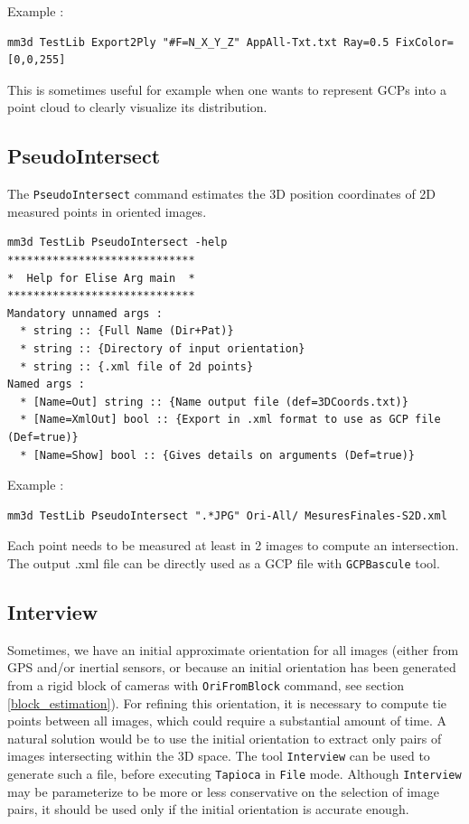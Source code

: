 Example :
\begin{verbatim}
mm3d TestLib Export2Ply "#F=N_X_Y_Z" AppAll-Txt.txt Ray=0.5 FixColor=[0,0,255]
\end{verbatim}

This is sometimes useful for example when one wants to represent GCPs into a point cloud to clearly visualize its distribution.

\subsection{PseudoIntersect}
The {\tt PseudoIntersect} command estimates the 3D position coordinates of 2D measured points in oriented images.

\begin{verbatim}
mm3d TestLib PseudoIntersect -help
*****************************
*  Help for Elise Arg main  *
*****************************
Mandatory unnamed args : 
  * string :: {Full Name (Dir+Pat)}
  * string :: {Directory of input orientation}
  * string :: {.xml file of 2d points}
Named args : 
  * [Name=Out] string :: {Name output file (def=3DCoords.txt)}
  * [Name=XmlOut] bool :: {Export in .xml format to use as GCP file (Def=true)}
  * [Name=Show] bool :: {Gives details on arguments (Def=true)}
\end{verbatim}

Example :
\begin{verbatim}
mm3d TestLib PseudoIntersect ".*JPG" Ori-All/ MesuresFinales-S2D.xml
\end{verbatim}

Each point needs to be measured at least in 2 images to compute an intersection.
The output .xml file can be directly used as a GCP file with {\tt GCPBascule} tool. \newline


\subsection{Interview}

Sometimes, we have an initial approximate orientation for all images (either from GPS and/or inertial sensors, or because an initial orientation has been generated from a rigid block of cameras with \texttt{OriFromBlock} command, see section \ref{block_estimation}). For refining this orientation, it is necessary to compute tie points between all images, which could require a substantial amount of time. A natural solution would be to use the initial orientation to extract only pairs of images intersecting within the 3D space. The tool \texttt{Interview} can be used to generate such a file, before executing \texttt{Tapioca} in \texttt{File} mode. Although \texttt{Interview} may be parameterize to be more or less conservative on the selection of image pairs, it should be used only if the initial orientation is accurate enough. \newline

